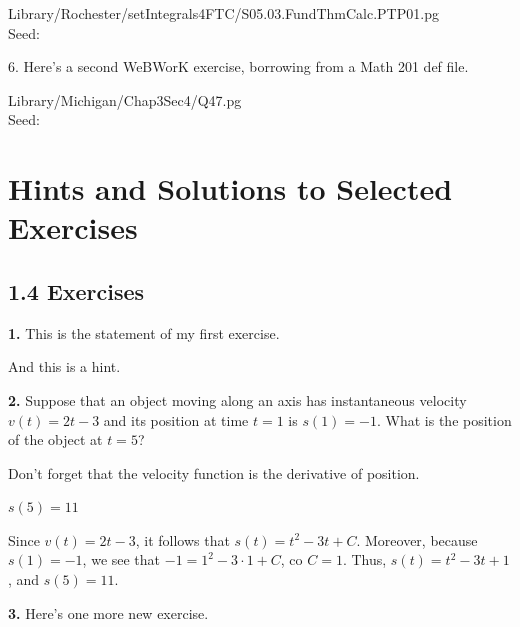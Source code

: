 \documentclass[10pt,]{book}
\theoremstyle{plain}
\theoremstyle{definition}
\theoremstyle{definition}
\theoremstyle{definition}
\begin{document}
\begin{exerciselist}
\begin{mdframed}
{\tiny\ttfamily\noindent
Library/Rochester/setIntegrals4FTC/S05.03.FundThmCalc.PTP01.pg\\Seed: \hfill}\end{mdframed}
\item[6.]\hypertarget{exercises-sets-with-webwork-2}{}\typeout{************************************************}
\typeout{************************************************}
Here's a second WeBWorK exercise, borrowing from a Math 201 def file.%
\mbox{}\\ %
\begin{mdframed}
{}\par\vspace*{2ex}%
{\tiny\ttfamily\noindent
Library/Michigan/Chap3Sec4/Q47.pg\\Seed: \hfill}\end{mdframed}
\end{exerciselist}
%
%
%
\appendix
%
\typeout{************************************************}
\typeout{************************************************}
\chapter[Hints and Solutions to Selected Exercises]{Hints and Solutions to Selected Exercises}\label{appendix-1}
\section*{1.4 Exercises}
\noindent\textbf{1.}\quad{}
			This is the statement of my first exercise.
		\par\smallskip

			And this is a hint.
		\par\smallskip
\noindent\textbf{2.}\quad{}
			Suppose that an object moving along an axis has instantaneous velocity \(v(t) = 2t-3\) and its position at time \(t=1\) is \(s(1) = -1\).  What is the position of the object at \(t = 5\)?
		\par\smallskip
 Don't forget that the velocity function is the derivative of position. \par\smallskip
\(s(5) = 11\)\par\smallskip
Since \(v(t) = 2t-3\), it follows that \(s(t) = t^2 - 3t + C\).  Moreover, because \(s(1)=-1\), we see that \(-1 = 1^2 - 3 \cdot 1 + C\), co \(C = 1\).  Thus, \(s(t) = t^2 - 3t + 1\), and \(s(5) = 11\). \par\smallskip
\noindent\textbf{3.}\quad{}
			Here's one more new exercise.
		\par{}\par\smallskip
%
\backmatter
%
\end{document}
